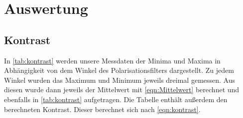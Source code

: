 \section{Auswertung}
\label{sec:Auswertung}



\subsection{Kontrast}
In \autoref{tab:kontrast} werden unsere Messdaten der Minima und Maxima in Abhängigkeit von dem Winkel des Polarisationsfilters dargestellt. 
Zu jedem Winkel wurden das Maximum und Minimum jeweils dreimal gemessen. Aus diesen wurde dann jeweils der Mittelwert mit \autoref{eqn:Mittelwert}
berechnet und ebenfalls in \autoref{tab:kontrast} aufgetragen. Die Tabelle enthält außerdem den berechneten Kontrast. Dieser berechnet sich nach 
\autoref{eqn:kontrast}.
